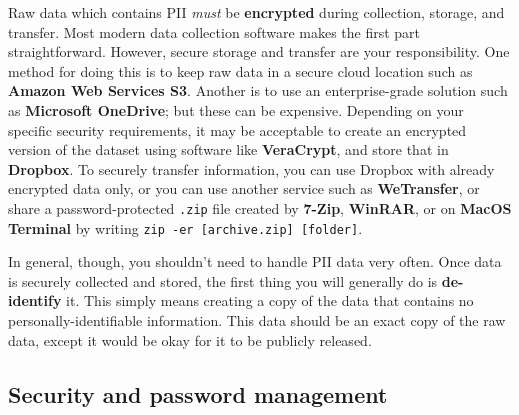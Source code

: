 Raw data which contains PII \textit{must} be \textbf{encrypted}
during collection, storage, and transfer.
Most modern data collection software makes the first part straightforward.
However, secure storage and transfer are your responsibility.
One method for doing this is to keep raw data in a secure cloud location such as \textbf{Amazon Web Services S3}.
Another is to use an enterprise-grade solution such as \textbf{Microsoft OneDrive}; but these can be expensive.
Depending on your specific security requirements,
it may be acceptable to create an encrypted version of the dataset
using software like \textbf{VeraCrypt}, and store that in \textbf{Dropbox}.
To securely transfer information,
you can use Dropbox with already encrypted data only,
or you can use another service such as \textbf{WeTransfer},
or share a password-protected \texttt{.zip} file created by \textbf{7-Zip},
\textbf{WinRAR},
or on \textbf{MacOS Terminal} by writing \texttt{zip -er [archive.zip] [folder]}.

In general, though, you shouldn't need to handle PII data very often.
Once data is securely collected and stored, the first thing you will generally do is \textbf{de-identify} it.
This simply means creating a copy of the data that contains no personally-identifiable information.
This data should be an exact copy of the raw data,
except it would be okay for it to be publicly released.\cite{matthews2011data}

\subsection{Security and password management}

